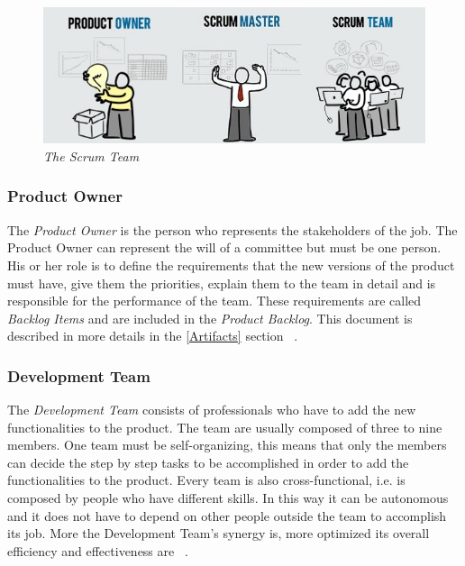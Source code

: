 			\begin{figure}[h]
			  \begin{center} 
			    \includegraphics[scale=0.75]{images/ch_04/scrum_team_final.jpg}
			  \end{center} 
			  \caption{\textit{The Scrum Team}}  
			  \label{fig:ScrumTeam}
		  	\end{figure}
			


			\subsubsection{Product Owner}
			The \emph{Product Owner} is the person who represents the stakeholders of the job. The Product Owner can represent the will of a committee but must be one person. His or her role is to define the requirements that the new versions of the product must have, give them the priorities, explain them to the team in detail and is responsible for the performance of the team. These requirements are called \emph{Backlog Items} and are included in the \emph{Product Backlog}. This document is described in more details in the \ref{Artifacts} section ~\cite{scrumEnglishGuide}.

			\subsubsection{Development Team}
			The \emph{Development Team} consists of professionals who have to add the new functionalities to the product. The team are usually composed of three to nine members. One team must be self-organizing, this means that only the members can decide the step by step tasks to be accomplished in order to add the functionalities to the product. Every team is also cross-functional, i.e. is composed by people who have different skills. In this way it can be autonomous and it does not have to depend on other people outside the team to accomplish its job. More the Development Team's synergy is, more optimized its overall efficiency and effectiveness are ~\cite{scrumEnglishGuide}.
 
